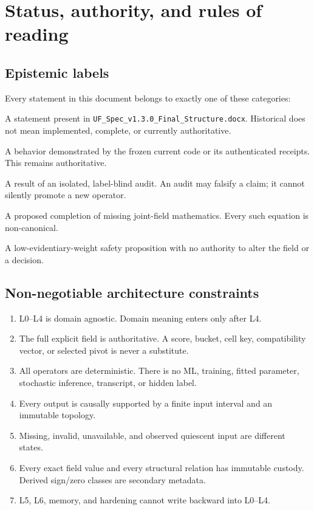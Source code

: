 \documentclass[11pt,oneside]{article}
\begin{document}
\section{Status, authority, and rules of reading}

\subsection{Epistemic labels}

Every statement in this document belongs to exactly one of these categories:
\begin{description}[leftmargin=3.2cm,style=nextline]
  \item[Historical v1.3] A statement present in
  \texttt{UF\_Spec\_v1.3.0\_Final\_Structure.docx}. Historical does not mean
  implemented, complete, or currently authoritative.
  \item[Current canonical] A behavior demonstrated by the frozen current code
  or its authenticated receipts. This remains authoritative.
  \item[Audited finding] A result of an isolated, label-blind audit. An audit
  may falsify a claim; it cannot silently promote a new operator.
  \item[Reconstruction] A proposed completion of missing joint-field
  mathematics. Every such equation is non-canonical.
  \item[Speculative hardening] A low-evidentiary-weight safety proposition
  with no authority to alter the field or a decision.
\end{description}

\subsection{Non-negotiable architecture constraints}

\begin{enumerate}
  \item L0--L4 is domain agnostic. Domain meaning enters only after L4.
  \item The full explicit field is authoritative. A score, bucket, cell key,
  compatibility vector, or selected pivot is never a substitute.
  \item All operators are deterministic. There is no ML, training, fitted
  parameter, stochastic inference, transcript, or hidden label.
  \item Every output is causally supported by a finite input interval and an
  immutable topology.
  \item Missing, invalid, unavailable, and observed quiescent input are
  different states.
  \item Every exact field value and every structural relation has immutable
  custody. Derived sign/zero classes are secondary metadata.
  \item L5, L6, memory, and hardening cannot write backward into L0--L4.
\end{enumerate}
\end{document}
